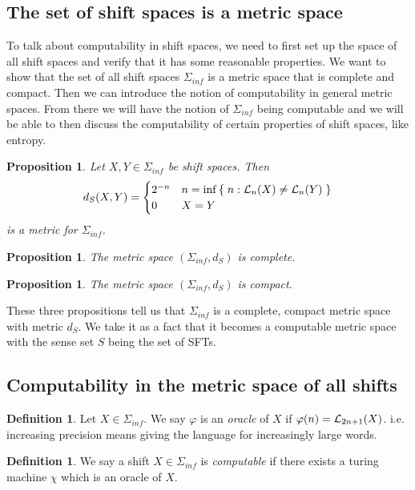 \documentclass[11pt, reqno]{amsart}
\theoremstyle{plain}
\numberwithin{thm}{subsection}
\newtheorem{prop}[thm]{Proposition}
\theoremstyle{definition}
\newtheorem{defn}[thm]{Definition}
\begin{document}
\subsection{The set of shift spaces is a metric space}

To talk about computability in shift spaces, we need to first set up the space of all shift spaces and verify that it has some reasonable properties. We want to show that the set of all shift spaces $\Sigma_{inf}$ is a metric space that is complete and compact. Then we can  introduce the notion of computability in general metric spaces. From there we will have the notion of $\Sigma_{inf}$ being computable and we will be able to then discuss the computability of certain properties of shift spaces, like entropy.

\begin{prop}
  Let $X, Y \in \Sigma_{inf}$ be shift spaces. Then
  $$d_S(X,Y) = \begin{cases}
    2^{-n} & n = \inf \,\{\;n : \mathcal{L}_n(X)\neq \mathcal{L}_n(Y)\;\} \\
    0 & X = Y \\  
  \end{cases}$$
  is a metric for $\Sigma_{inf}$. 
\end{prop}

\begin{prop}
  The metric space $(\Sigma_{inf}, d_S)$ is complete.
\end{prop}

\begin{prop}
  The metric space $(\Sigma_{inf}, d_S)$ is compact.
\end{prop}

These three propositions tell us that $\Sigma_{inf}$ is a complete, compact metric space with metric $d_S$. We take it as a fact that it becomes a computable metric space with the sense set $S$ being the set of SFTs.

\subsection{Computability in the metric space of all shifts}\cite[L7]{wolf}  

\begin{defn}
  Let $X \in \Sigma_{inf}$. We say $\varphi$ is an \textit{oracle} of $X$ if $\varphi(n) = \mathcal{L}_{2n+1}(X)$. i.e. increasing precision means giving the language for increasingly large words.
\end{defn}

\begin{defn}
  We say a shift $X \in \Sigma_{inf}$ is \textit{computable} if there exists a turing machine $\chi$ which is an oracle of $X$.
\end{defn}
\end{document}

